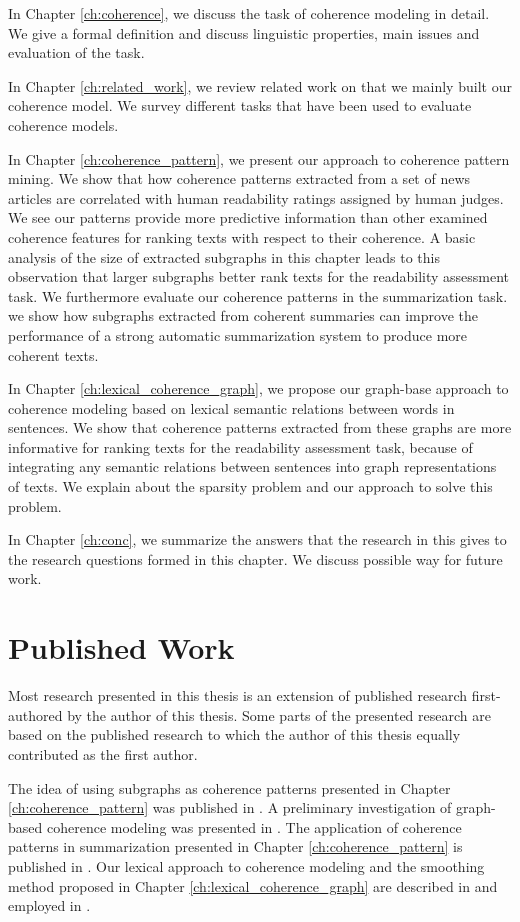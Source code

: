 In Chapter \ref{ch:coherence}, we discuss the task of coherence modeling in detail. 
We give a formal definition and discuss linguistic properties, main issues and evaluation of the task. 

In Chapter \ref{ch:related_work}, we review related work on that we mainly built our coherence model. 
We survey different tasks that have been used to evaluate coherence models. 

In Chapter \ref{ch:coherence_pattern}, we present our approach to coherence pattern mining. 
We show that how coherence patterns extracted from a set of news articles are correlated with human readability ratings assigned by human judges. 
We see our patterns provide more predictive information than other examined coherence features for ranking texts with respect to their coherence. 
A basic analysis of the size of extracted subgraphs in this chapter leads to this observation that larger subgraphs better rank texts for the readability assessment task. 
We furthermore evaluate our coherence patterns in the summarization task.  
we show how subgraphs extracted from coherent summaries can improve the performance of a strong automatic summarization system to produce more coherent texts. 

In Chapter \ref{ch:lexical_coherence_graph}, we propose our graph-base approach to coherence modeling based on lexical semantic relations between words in sentences. 
We show that coherence patterns extracted from these graphs are more informative for ranking texts for the readability assessment task, because of integrating any semantic relations between sentences into graph representations of texts. 
We explain about the sparsity problem and our approach to solve this problem. 

In Chapter \ref{ch:conc}, we summarize the answers that the research in this gives to the research questions formed in this chapter. 
We discuss possible way for future work. 

\section{Published Work}
\label{sec:intro-published}

Most research presented in this thesis is an extension of published research first-authored by the author of this thesis. 
Some parts of the presented research are based on the published research to which the author of this thesis equally contributed as the first author. 

The idea of using subgraphs as coherence patterns presented in Chapter \ref{ch:coherence_pattern} was published in . 
A preliminary investigation of graph-based coherence modeling was presented in . 
The application of coherence patterns in summarization presented in Chapter \ref{ch:coherence_pattern} is published in . 
Our lexical approach to coherence modeling and the smoothing method proposed in Chapter \ref{ch:lexical_coherence_graph} are described in  and employed in . 



